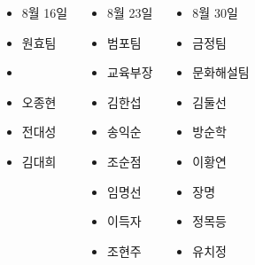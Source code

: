 \documentclass[	20pt, 
							a1paper, 
							portrait, %
							margin=0mm, %
							innermargin=10mm,  		%
							blockverticalspace=4mm, %
							colspace=5mm, 
							subcolspace=0mm
							]{tikzposter}
\begin{document}
\begin{columns}
			{
			\setlength{\leftmargini}{3em}			
			\begin{itemize}
				\item [일자]		8월 16일 
				\item [팀명]		원효팀
				\item [팀장]		
				\item 오종현
				\item 전대성
				\item 김대희
			\end{itemize}
			}


			{
			\setlength{\leftmargini}{3em}			
			\begin{itemize}
				\item [일자]		8월 23일 
				\item [팀명]		범포팀 
				\item [팀장]		교육부장
				\item 김한섭
				\item 송익순
				\item 조순점
				\item 임명선
				\item 이득자
				\item 조현주
			\end{itemize}
		}

			{
			\setlength{\leftmargini}{3em}			
			\begin{itemize}
				\item [일자]		8월 30일 
				\item [팀명]		금정팀 
				\item [팀장]		문화해설팀
				\item 김둘선
				\item 방순학
				\item 이황연
				\item 장명
				\item 정목등
				\item 유치정
			\end{itemize}
		}


	\end{columns}
\end{document}
